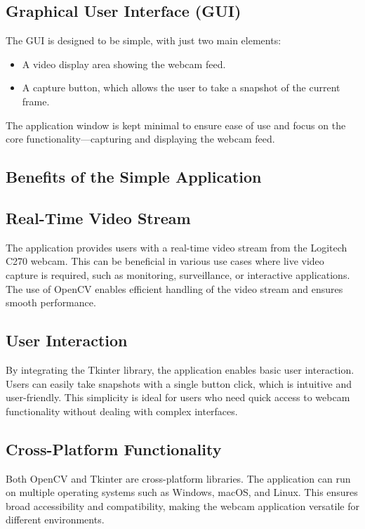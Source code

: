 \subsection*{Graphical User Interface (GUI)}
The GUI is designed to be simple, with just two main elements:
\begin{itemize}
	\item A video display area showing the webcam feed.
	\item A capture button, which allows the user to take a snapshot of the current frame.
\end{itemize}
The application window is kept minimal to ensure ease of use and focus on the core functionality—capturing and displaying the webcam feed.

\subsection{Benefits of the Simple Application}

\subsection*{Real-Time Video Stream}
The application provides users with a real-time video stream from the Logitech C270 webcam. This can be beneficial in various use cases where live video capture is required, such as monitoring, surveillance, or interactive applications. The use of OpenCV enables efficient handling of the video stream and ensures smooth performance.

\subsection*{User Interaction}
By integrating the Tkinter library, the application enables basic user interaction. Users can easily take snapshots with a single button click, which is intuitive and user-friendly. This simplicity is ideal for users who need quick access to webcam functionality without dealing with complex interfaces.

\subsection*{Cross-Platform Functionality}
Both OpenCV and Tkinter are cross-platform libraries. The application can run on multiple operating systems such as Windows, macOS, and Linux. This ensures broad accessibility and compatibility, making the webcam application versatile for different environments.

